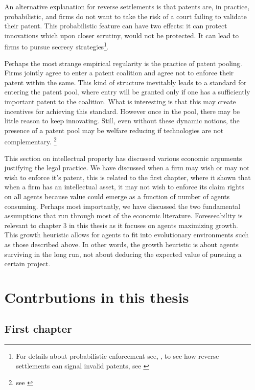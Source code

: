An alternative explanation for reverse settlements is that patents are, in practice, probabilistic, and firms do not want to take the risk of a court failing to validate their patent. This probabilistic feature can have two effects: it can protect innovations which upon closer scrutiny, would not be protected. It can lead to firms to pursue secrecy strategies\footnote{For details about probabilistic enforcement see, \cite{Lemley2005}, to see how reverse settlements can signal invalid patents, see \cite{Dolin2011}}.

Perhaps the most strange empirical regularity is the practice of patent pooling. Firms jointly agree to enter a patent coalition and agree not to enforce their patent within the same. This kind of structure inevitably leads to a standard for entering the patent pool, where entry will be granted only if one has a sufficiently important patent to the coalition. What is interesting is that this may create incentives for achieving this standard. However once in the pool, there may be little reason to keep innovating. Still, even without these dynamic notions, the presence of a patent pool may be welfare reducing if technologies are not complementary. \footnote{see \cite{Lerner2004}}

This section on intellectual property has discussed various economic arguments justifying the legal practice. We have discussed when a firm may wish or may not wish to enforce it's patent, this is related to the first chapter, where it shown that when a firm has an intellectual asset, it may not wish to enforce its claim rights on all agents because value could emerge as a function of number of agents consuming. Perhaps most importantly, we have discussed the two fundamental assumptions that run through most of the economic literature. Foreseeability is relevant to chapter 3 in this thesis as it focuses on agents maximizing growth. This growth heuristic allows for agents to fit into evolutionary environments such as those described above. In other words, the growth heuristic is about agents surviving in the long run, not about deducing the expected value of pursuing a certain project. 

\newpage

\section{Contrbutions in this thesis}

\subsection{First chapter}

